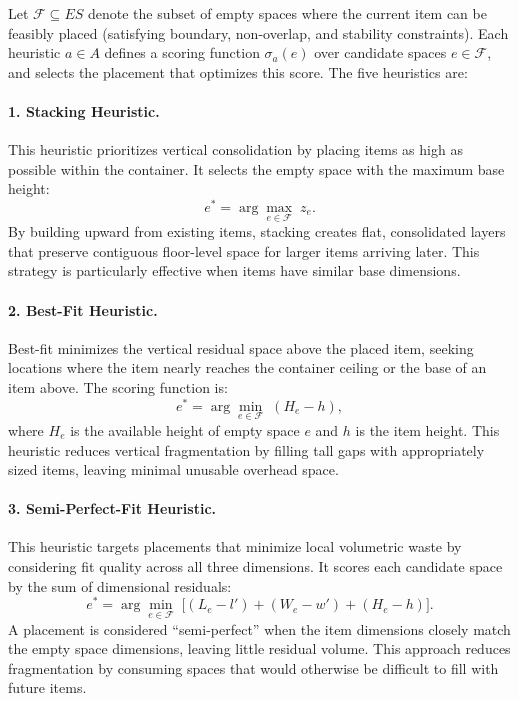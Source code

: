 \documentclass[runningheads]{llncs}
\begin{document}
Let $\mathcal{F} \subseteq ES$ denote the subset of empty spaces where the current item can be feasibly placed (satisfying boundary, non-overlap, and stability constraints). Each heuristic $a \in A$ defines a scoring function $\sigma_a(e)$ over candidate spaces $e \in \mathcal{F}$, and selects the placement that optimizes this score. The five heuristics are:

\paragraph{1. Stacking Heuristic.}
This heuristic prioritizes vertical consolidation by placing items as high as possible within the container. It selects the empty space with the maximum base height:
\begin{equation}
    e^* = \arg\max_{e \in \mathcal{F}} \; z_e.
\end{equation}
By building upward from existing items, stacking creates flat, consolidated layers that preserve contiguous floor-level space for larger items arriving later. This strategy is particularly effective when items have similar base dimensions.

\paragraph{2. Best-Fit Heuristic.}
Best-fit minimizes the vertical residual space above the placed item, seeking locations where the item nearly reaches the container ceiling or the base of an item above. The scoring function is:
\begin{equation}
    e^* = \arg\min_{e \in \mathcal{F}} \; (H_e - h),
\end{equation}
where $H_e$ is the available height of empty space $e$ and $h$ is the item height. This heuristic reduces vertical fragmentation by filling tall gaps with appropriately sized items, leaving minimal unusable overhead space.

\paragraph{3. Semi-Perfect-Fit Heuristic.}
This heuristic targets placements that minimize local volumetric waste by considering fit quality across all three dimensions. It scores each candidate space by the sum of dimensional residuals:
\begin{equation}
    e^* = \arg\min_{e \in \mathcal{F}} \; \bigl[(L_e - l') + (W_e - w') + (H_e - h)\bigr].
\end{equation}
A placement is considered ``semi-perfect'' when the item dimensions closely match the empty space dimensions, leaving little residual volume. This approach reduces fragmentation by consuming spaces that would otherwise be difficult to fill with future items.
\end{document}
